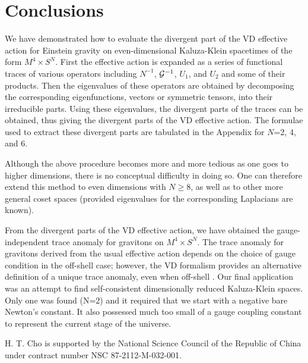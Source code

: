 \documentclass[a4paper,aps,preprint,groupedaddress,showpacs]{revtex4}
\begin{document}
\section{Conclusions}

We have demonstrated how to evaluate the divergent part of the VD
effective action for Einstein gravity on even-dimensional Kaluza-Klein spacetimes 
of the form $M^{4}\times S^{N}$.
First the effective action is expanded as a series of functional
traces of various operators including $N^{-1}$, ${\cal G}^{-1}$, 
$U_{1}$, and $U_{2}$ and some of their products. Then the eigenvalues of these operators
are obtained by decomposing the corresponding eigenfunctions, 
vectors or symmetric tensors, into their irreducible parts. 
Using these eigenvalues, the divergent parts of the traces can
be obtained, thus giving the divergent parts 
of the VD effective action. 
The formulae used to extract these divergent
parts are tabulated in the Appendix for $N$=2, 4, and 6.

Although the above procedure becomes more and more tedious as
one goes to higher dimensions, there is no conceptual 
difficulty in doing so. One can therefore extend this method
to even dimensions with $N\ge 8$, as well as to other more general coset 
spaces (provided eigenvalues
for the corresponding Laplacians are known).

From the divergent parts of the VD effective action, we 
have obtained the gauge-independent trace anomaly
for gravitons on $M^{4}\times S^{N}$. The trace anomaly
for gravitons derived from the usual effective action depends
on the choice of gauge condition in the off-shell case; however, 
the VD formalism provides an alternative definition
of a unique trace anomaly, even when 
off-shell \cite{CK3}. Our final application was an attempt to find 
self-consistent dimensionally reduced Kaluza-Klein spaces.
Only one was found (N=2) and it required that we start with
a negative bare Newton's constant. It also possessed much too
small of a gauge coupling constant to represent the current 
stage of the universe. 


\begin{acknowledgments}
H. T. Cho is supported by the National Science Council
of the Republic of China under contract number 
NSC 87-2112-M-032-001. 
\end{acknowledgments}

\appendix
\section*{}
\end{document}
